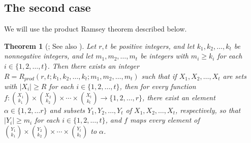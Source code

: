 \documentclass[11pt]{article}
\newtheorem{theorem}{Theorem}[section]
\newcommand\abs[1]{\lvert #1\rvert}
\begin{document}
	
	\subsection{The second case}\label{subsec:dcm}


        
        We will use the product Ramsey theorem described below.
\begin{theorem}[{\cite[Theorem 11.5]{Trotter1992}}; See also \cite{GrahamRS1990}]\label{thm:productramsey}
Let $r, t$ be positive integers, and let $k_1, k_2, \ldots, k_t$ be nonnegative integers, and
let $m_1, m_2, \ldots, m_t$ be integers with $m_i\ge k_i$ for each $i\in \{1, 2, \ldots, t\}$.
Then there exists an integer $R=R_{prod}(r,t;k_1, k_2, \ldots, k_t; m_1, m_2, \ldots, m_t)$ such that
if $X_1, X_2, \ldots, X_t$ are sets with $\abs{X_i}\ge R$ for each $i\in \{1, 2, \ldots, t\}$, 
then for every function $f:{X_1 \choose k_1}\times {X_2 \choose k_2} \times \cdots \times {X_t \choose k_t} \rightarrow \{1, 2, \ldots, r\}$, 
there exist an element $\alpha\in \{1, 2, \ldots r\}$ and subsets $Y_1, Y_2, \ldots, Y_t$ of $X_1, X_2, \ldots, X_t$, respectively, 
so that $\abs{Y_i}\ge m_i$ for each $i\in \{1, 2, \ldots, t\}$, and 
$f$ maps every element of ${Y_1\choose k_1}\times {Y_2\choose k_2}\times \cdots \times {Y_t\choose k_t}$ to $\alpha$.
\end{theorem}
\end{document}
